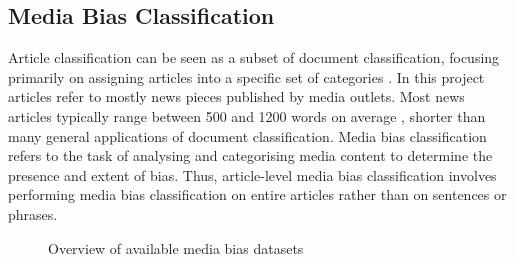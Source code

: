\subsection{Media Bias Classification}

Article classification can be seen as a subset of document classification, focusing primarily on assigning articles into a specific set of categories \cite{dien-2019-article-classification}. In this project articles refer to mostly news pieces published by media outlets. Most news articles typically range between 500 and 1200 words on average \cite{newswhip-2013-article-length}, shorter than many general applications of document classification. Media bias classification refers to the task of analysing and categorising media content to determine the presence and extent of bias. Thus, article-level media bias classification involves performing media bias classification on entire articles rather than on sentences or phrases.

\begin{figure}[htbp]
    \centering
    \caption{Overview of available media bias datasets \cite{rodrigo-2024-systematic-review-media-bias}}
    \label{fig:media-bias-datasets-overview}
\end{figure}


